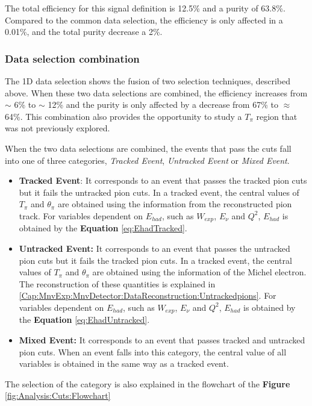 The total efficiency for this signal definition is 12.5\% and a purity of 63.8\%. Compared to the common data selection, the efficiency is only affected in a 0.01\%, and the total purity decrease a 2\%.  

\pagebreak

\subsubsection{Data selection combination}

The 1D data selection shows the fusion of two selection techniques, described above. When these two data selections are combined, the efficiency increases from \(\sim\) 6\% to \(\sim\) 12\% and the purity is only affected by a decrease from 67\% to $\approx$ 64\%. This combination also provides the opportunity to study a $T_\pi$ region that was not previously explored. 

When the two data selections are combined, the events that pass the cuts fall into one of three categories, \textit{Tracked Event}, \textit{Untracked Event} or \textit{Mixed Event}.
\begin{itemize}
    \item \textbf{Tracked Event}: It corresponds to an event that passes the tracked pion cuts but it fails the untracked pion cuts. In a tracked event, the central values of $T_\pi$ and $\theta_\pi$ are obtained using the information from the reconstructed pion track. For variables dependent on $E_{had}$, such as $W_{exp}$, $E_\nu$ and $Q^2$, $E_{had}$ is obtained by the \textbf{Equation} \ref{eq:EhadTracked}.
    \item \textbf{Untracked Event:} It corresponds to an event that passes the untracked pion cuts but it fails the tracked pion cuts. In a tracked event, the central values of $T_\pi$ and $\theta_\pi$ are obtained using the information of the Michel electron. The reconstruction of these quantities is explained in \ref{Cap:MnvExp:MnvDetector:DataReconstruction:Untrackedpions}. For variables dependent on $E_{had}$, such as $W_{exp}$, $E_\nu$ and $Q^2$, $E_{had}$ is obtained by the \textbf{Equation} \ref{eq:EhadUntracked}.
    \item  \textbf{Mixed Event:} It corresponds to an event that passes tracked and untracked pion cuts. When an event falls into this category, the central value of all variables is obtained in the same way as a tracked event. 
\end{itemize}
The selection of the category is also explained in the flowchart of the \textbf{Figure} \ref{fig:Analysis:Cuts:Flowchart} 

